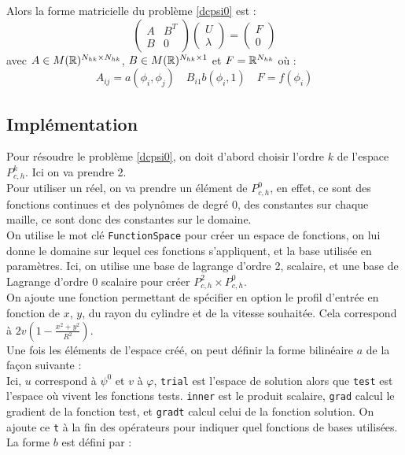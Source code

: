 Alors la forme matricielle du problème \ref{dcpsi0} est :
\[ \begin{pmatrix} A & B^T\\ B & 0\end{pmatrix}\begin{pmatrix}U\\ \lambda\end{pmatrix} = \begin{pmatrix} F\\0 \end{pmatrix} \]
avec $A\in M({\mathbb{R}})^{N_{hk}\times N_{hk}}$, $B\in M({\mathbb{R}})^{N_{hk}\times 1}$ et $F={\mathbb{R}}^{N_{hk}}$ où :
\[ A_{ij} = a(\phi_i,\phi_j)\quad B_{i1} b(\phi_i,1)\quad F=f(\phi_i) \]

\subsection{Implémentation}
Pour résoudre le problème \ref{dcpsi0}, on doit d'abord choisir l'ordre $k$ de l'espace $P_{c,h}^k$. Ici on va prendre 2.\\
Pour utiliser un réel, on va prendre un élément de $P_{c,h}^0$, en effet, ce sont des fonctions continues et des polynômes de degré 0, des constantes sur chaque maille, ce sont donc des constantes sur le domaine.\\
On utilise le mot clé \texttt{FunctionSpace} pour créer un espace de fonctions, on lui donne le domaine sur lequel ces fonctions s'appliquent, et la base utilisée en paramètres. Ici, on utilise une base de lagrange d'ordre 2, scalaire, et une base de Lagrange d'ordre 0 scalaire pour créer $P^2_{c,h}\times P^0_{c,h}$.\\


On ajoute une fonction permettant de spécifier en option le profil d'entrée en fonction de $x$, $y$, du rayon du cylindre et de la vitesse souhaitée. Cela correspond à $2v\left(1-\frac{x^2+y^2}{R^2}\right)$.\\



Une fois les éléments de l'espace créé, on peut définir la forme bilinéaire $a$ de la façon suivante :\\



Ici, $u$ correspond à $\psi^0$ et $v$ à $\varphi$, \texttt{trial} est l'espace de solution alors que \texttt{test} est l'espace où vivent les fonctions tests. \texttt{inner} est le produit scalaire, \texttt{grad} calcul le gradient de la fonction test, et \texttt{gradt} calcul celui de la fonction solution. On ajoute ce \texttt{t} à la fin des opérateurs pour indiquer quel fonctions de bases utilisées.\\
La forme $b$ est défini par :\\


